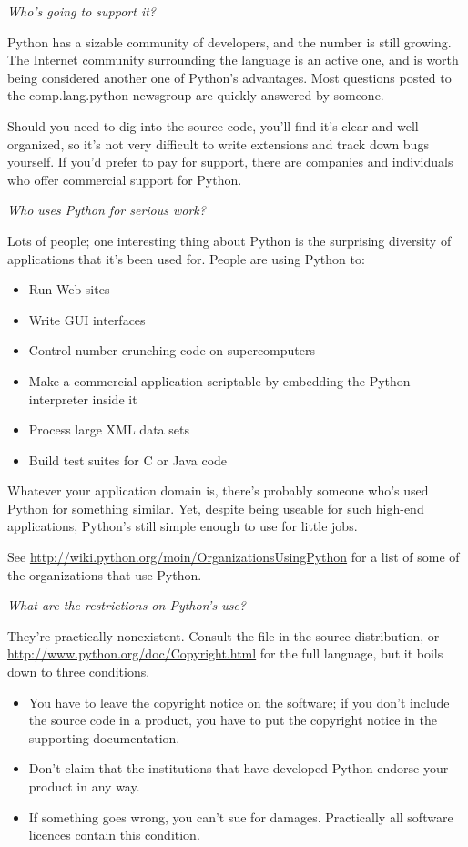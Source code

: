 \documentclass{howto}
\begin{document}
\emph{Who's going to support it?}

Python has a sizable community of developers, and the number is still
growing.  The Internet community surrounding the language is an active
one, and is worth being considered another one of Python's advantages.
Most questions posted to the comp.lang.python newsgroup are quickly
answered by someone.

Should you need to dig into the source code, you'll find it's clear
and well-organized, so it's not very difficult to write extensions and
track down bugs yourself.  If you'd prefer to pay for support, there
are companies and individuals who offer commercial support for Python.

\emph{Who uses Python for serious work?}

Lots of people; one interesting thing about Python is the surprising
diversity of applications that it's been used for.  People are using
Python to:

\begin{itemize}
\item Run Web sites
\item Write GUI interfaces
\item Control
number-crunching code on supercomputers
\item Make a commercial application scriptable by embedding the Python
interpreter inside it
\item Process large XML data sets
\item Build test suites for C or Java code
\end{itemize}

Whatever your application domain is, there's probably someone who's
used Python for something similar.  Yet, despite being useable for
such high-end applications, Python's still simple enough to use for
little jobs.

See \url{http://wiki.python.org/moin/OrganizationsUsingPython} for a list of some of the 
organizations that use Python.

\emph{What are the restrictions on Python's use?}

They're practically nonexistent.  Consult the 
file in the source distribution, or
\url{http://www.python.org/doc/Copyright.html} for the full language,
but it boils down to three conditions.

\begin{itemize}

\item You have to leave the copyright notice on the software; if you
don't include the source code in a product, you have to put the
copyright notice in the supporting documentation.  

\item Don't claim that the institutions that have developed Python
endorse your product in any way.

\item If something goes wrong, you can't sue for damages.  Practically
all software licences contain this condition.

\end{itemize}
\end{document}
